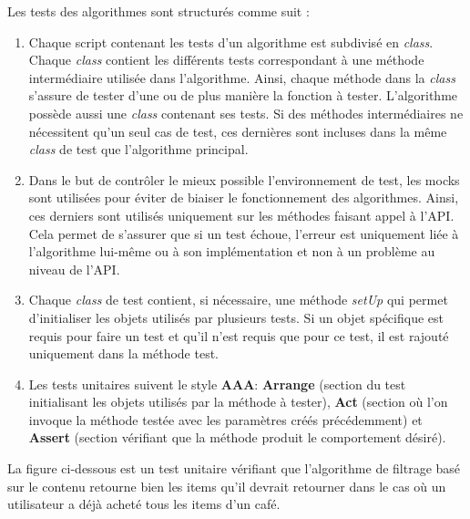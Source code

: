 \documentclass[11pt]{article}
\begin{document}
Les tests des algorithmes sont structurés comme suit :
\begin{enumerate}
	\item Chaque script contenant les tests d'un algorithme est subdivisé en \textit{class}. Chaque \textit{class} contient les différents tests correspondant à une méthode intermédiaire utilisée dans l'algorithme. Ainsi, chaque méthode dans la \textit{class} s'assure de tester d'une ou de plus manière la fonction à tester. L'algorithme possède aussi une \textit{class} contenant ses tests. Si des méthodes intermédiaires ne nécessitent qu'un seul cas de test, ces dernières sont incluses dans la même \textit{class} de test que l'algorithme principal.\\
	
	\item Dans le but de contrôler le mieux possible l'environnement de test, les mocks sont utilisées pour éviter de biaiser le fonctionnement des algorithmes. Ainsi, ces derniers sont utilisés uniquement sur les méthodes faisant appel à l'API. Cela permet de s'assurer que si un test échoue, l'erreur est uniquement liée à l'algorithme lui-même ou à son implémentation et non à un problème au niveau de l'API.\\
	
	\item Chaque \textit{class} de test contient, si nécessaire, une méthode \textit{setUp} qui permet d'initialiser les objets utilisés par plusieurs tests. Si un objet spécifique est requis pour faire un test et qu'il n'est requis que pour ce test, il est rajouté uniquement dans la méthode test.\\
	
	\item Les tests unitaires suivent le style \textbf{AAA}: \textbf{Arrange} (section du test initialisant les objets utilisés par la méthode à tester), \textbf{Act} (section où l’on invoque la méthode testée avec les paramètres créés précédemment) et \textbf{Assert} (section vérifiant que la méthode produit le comportement désiré).\\
\end{enumerate}

La figure ci-dessous est un test unitaire vérifiant que l'algorithme de filtrage basé sur le contenu retourne bien les items qu'il devrait retourner dans le cas où un utilisateur a déjà acheté tous les items d'un café.
\end{document}

